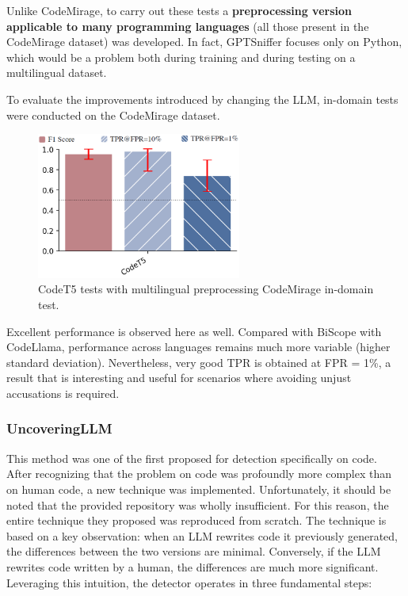 Unlike CodeMirage, to carry out these tests a \textbf{preprocessing 
version applicable to many programming languages} (all those present in 
the CodeMirage dataset) was developed. In fact, GPTSniffer focuses only on 
Python, which would be a problem both during training and during testing on 
a multilingual dataset.

To evaluate the improvements introduced by changing the LLM, in-domain tests 
were conducted on the CodeMirage dataset.
\begin{figure}[H]
    \centering
    \includegraphics[width=0.6\textwidth]{img/CodeT5/default.png}
    \caption{CodeT5 tests with multilingual preprocessing CodeMirage in-domain test.}
    \label{fig:CodeT5 tests with multilingual preprocessing}
\end{figure}

Excellent performance is observed here as well. Compared with BiScope 
with CodeLlama, performance across languages remains much more variable 
(higher standard deviation). Nevertheless, very good TPR is obtained at FPR = 1\%, 
a result that is interesting and useful for scenarios where avoiding unjust 
accusations is required.


\clearpage
\subsubsection{UncoveringLLM}
This method was one of the first proposed for detection specifically on code. 
After recognizing that the problem on code was profoundly more complex than on 
human code, a new technique was implemented. Unfortunately, it should be noted 
that the provided repository was wholly insufficient. For this reason, the entire 
technique they proposed was reproduced from scratch.
The technique is based on a key observation: when an LLM rewrites code it previously 
generated, the differences between the two versions are minimal. Conversely, if the 
LLM rewrites code written by a human, the differences are much more significant. 
Leveraging this intuition, the detector operates in three fundamental steps:

